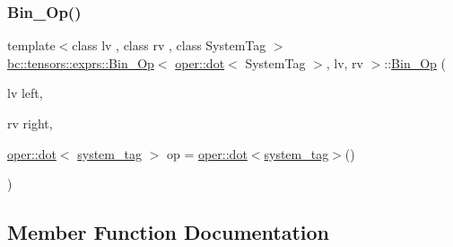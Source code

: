 \subsubsection{\texorpdfstring{Bin\+\_\+\+Op()}{Bin\_Op()}}
{\footnotesize\ttfamily template$<$class lv , class rv , class System\+Tag $>$ \\
\hyperlink{structbc_1_1tensors_1_1exprs_1_1Bin__Op}{bc\+::tensors\+::exprs\+::\+Bin\+\_\+\+Op}$<$ \hyperlink{structbc_1_1oper_1_1dot}{oper\+::dot}$<$ System\+Tag $>$, lv, rv $>$\+::\hyperlink{structbc_1_1tensors_1_1exprs_1_1Bin__Op}{Bin\+\_\+\+Op} (\begin{DoxyParamCaption}\item[{lv}]{left,  }\item[{rv}]{right,  }\item[{\hyperlink{structbc_1_1oper_1_1dot}{oper\+::dot}$<$ \hyperlink{structbc_1_1tensors_1_1exprs_1_1Bin__Op_3_01oper_1_1dot_3_01SystemTag_01_4_00_01lv_00_01rv_01_4_aac42309fcd782d98f3d908ce98defba8}{system\+\_\+tag} $>$}]{op = {\ttfamily \hyperlink{structbc_1_1oper_1_1dot}{oper\+::dot}$<$\hyperlink{structbc_1_1tensors_1_1exprs_1_1Bin__Op_3_01oper_1_1dot_3_01SystemTag_01_4_00_01lv_00_01rv_01_4_aac42309fcd782d98f3d908ce98defba8}{system\+\_\+tag}$>$()} }\end{DoxyParamCaption})\hspace{0.3cm}{\ttfamily [inline]}}



\subsection{Member Function Documentation}
\mbox{\label{structbc_1_1tensors_1_1exprs_1_1Bin__Op_3_01oper_1_1dot_3_01SystemTag_01_4_00_01lv_00_01rv_01_4_afbee15d8347800bab6db511df9ea245b}} 
